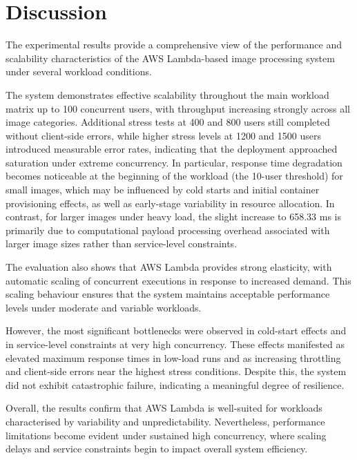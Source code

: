 \documentclass[11pt,a4paper,twocolumn]{article}
\begin{document}
\section{Discussion}

The experimental results provide a comprehensive view of the performance and scalability characteristics of the AWS 
Lambda-based image processing system under several workload conditions.

The system demonstrates effective scalability throughout the main workload matrix up to 100 concurrent users, with throughput increasing strongly across all image categories. Additional stress tests at 400 and 800 users still completed without client-side errors, while higher stress levels at 1200 and 1500 users introduced measurable error rates, indicating that the deployment approached saturation under extreme concurrency. In particular, response time degradation becomes noticeable at the beginning of the workload (the 10-user threshold) for small images, which may be influenced by cold starts and initial container provisioning effects, as well as early-stage variability in resource allocation. In contrast, for larger images under heavy load, the slight increase to 658.33 ms is primarily due to computational payload processing overhead associated with larger image sizes rather than service-level constraints.

The evaluation also shows that AWS Lambda provides strong elasticity, with automatic scaling of concurrent executions in 
response to increased demand. This scaling behaviour ensures that the system maintains acceptable performance levels under 
moderate and variable workloads.

However, the most significant bottlenecks were observed in cold-start effects and in service-level constraints at very high concurrency. These effects manifested as elevated maximum response times in low-load runs and as increasing throttling and client-side errors near the highest stress conditions. Despite this, the system did not exhibit catastrophic failure, indicating a meaningful degree of resilience.

Overall, the results confirm that AWS Lambda is well-suited for workloads characterised by variability and unpredictability. 
Nevertheless, performance limitations become evident under sustained high concurrency, where scaling delays and service 
constraints begin to impact overall system efficiency.

\end{document}
